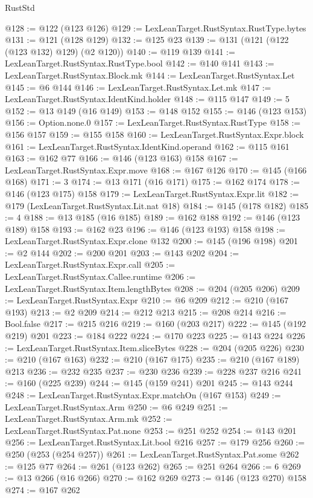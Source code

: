 \begin{lexlean}{RustStd}
\begin{coremodule}
@128 := @122 (@123 @126)
@129 := LexLeanTarget.RustSyntax.RustType.bytes
@131 := @121 (@128 @129)
@132 := @125 @23
@139 := @131 (@121 (@122 (@123 @132) @129) (@2 @120))
@140 := @119 @139
@141 := LexLeanTarget.RustSyntax.RustType.bool
@142 := @140 @141
@143 := LexLeanTarget.RustSyntax.Block.mk
@144 := LexLeanTarget.RustSyntax.Let
@145 := @6 @144
@146 := LexLeanTarget.RustSyntax.Let.mk
@147 := LexLeanTarget.RustSyntax.IdentKind.holder
@148 := @115 @147
@149 := 5
@152 := @13 @149 (@16 @149)
@153 := @148 @152
@155 := @146 (@123 @153)
@156 := Option.none.{0}
@157 := LexLeanTarget.RustSyntax.RustType
@158 := @156 @157
@159 := @155 @158
@160 := LexLeanTarget.RustSyntax.Expr.block
@161 := LexLeanTarget.RustSyntax.IdentKind.operand
@162 := @115 @161
@163 := @162 @77
@166 := @146 (@123 @163) @158
@167 := LexLeanTarget.RustSyntax.Expr.move
@168 := @167 @126
@170 := @145 (@166 @168)
@171 := 3
@174 := @13 @171 (@16 @171)
@175 := @162 @174
@178 := @146 (@123 @175) @158
@179 := LexLeanTarget.RustSyntax.Expr.lit
@182 := @179 (LexLeanTarget.RustSyntax.Lit.nat @18)
@184 := @145 (@178 @182)
@185 := 4
@188 := @13 @185 (@16 @185)
@189 := @162 @188
@192 := @146 (@123 @189) @158
@193 := @162 @23
@196 := @146 (@123 @193) @158
@198 := LexLeanTarget.RustSyntax.Expr.clone @132
@200 := @145 (@196 @198)
@201 := @2 @144
@202 := @200 @201
@203 := @143 @202
@204 := LexLeanTarget.RustSyntax.Expr.call
@205 := LexLeanTarget.RustSyntax.Callee.runtime
@206 := LexLeanTarget.RustSyntax.Item.lengthBytes
@208 := @204 (@205 @206)
@209 := LexLeanTarget.RustSyntax.Expr
@210 := @6 @209
@212 := @210 (@167 @193)
@213 := @2 @209
@214 := @212 @213
@215 := @208 @214
@216 := Bool.false
@217 := @215 @216
@219 := @160 (@203 @217)
@222 := @145 (@192 @219) @201
@223 := @184 @222
@224 := @170 @223
@225 := @143 @224
@226 := LexLeanTarget.RustSyntax.Item.sliceBytes
@228 := @204 (@205 @226)
@230 := @210 (@167 @163)
@232 := @210 (@167 @175)
@235 := @210 (@167 @189) @213
@236 := @232 @235
@237 := @230 @236
@239 := @228 @237 @216
@241 := @160 (@225 @239)
@244 := @145 (@159 @241) @201
@245 := @143 @244
@248 := LexLeanTarget.RustSyntax.Expr.matchOn (@167 @153)
@249 := LexLeanTarget.RustSyntax.Arm
@250 := @6 @249
@251 := LexLeanTarget.RustSyntax.Arm.mk
@252 := LexLeanTarget.RustSyntax.Pat.none
@253 := @251 @252
@254 := @143 @201
@256 := LexLeanTarget.RustSyntax.Lit.bool @216
@257 := @179 @256
@260 := @250 (@253 (@254 @257))
@261 := LexLeanTarget.RustSyntax.Pat.some
@262 := @125 @77
@264 := @261 (@123 @262)
@265 := @251 @264
@266 := 6
@269 := @13 @266 (@16 @266)
@270 := @162 @269
@273 := @146 (@123 @270) @158
@274 := @167 @262

\end{coremodule}
\end{lexlean}
